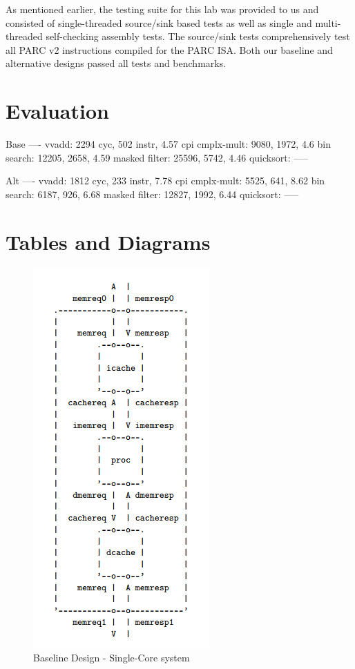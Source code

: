 \documentclass[10pt]{article}
\begin{document}
As mentioned earlier, the testing suite for this lab was provided to us and consisted of single-threaded source/sink based tests as well as single and multi-threaded self-checking assembly tests. The source/sink tests comprehensively test all PARC v2 instructions compiled for the PARC ISA. Both our baseline and alternative designs passed all tests and benchmarks. 



\section{Evaluation}

Base
----
vvadd:     2294 cyc, 502 instr, 4.57 cpi
cmplx-mult: 9080, 1972, 4.6
bin search: 12205, 2658, 4.59
masked filter: 25596, 5742, 4.46
quicksort: -----

Alt
----
vvadd:     1812 cyc, 233 instr, 7.78 cpi
cmplx-mult: 5525, 641, 8.62
bin search: 6187, 926, 6.68
masked filter: 12827, 1992, 6.44
quicksort: -----


\newpage
\section {Tables and Diagrams}


\begin{figure}[h]
	\centering
	\includegraphics[scale=0.4, angle=90]{bline-diag}
	\caption{Baseline Design - Single-Core system}
\end{figure}
\end{document}
